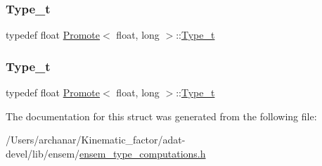 \subsubsection{\texorpdfstring{Type\_t}{Type\_t}\hspace{0.1cm}{\footnotesize\ttfamily [2/3]}}
{\footnotesize\ttfamily typedef float \mbox{\hyperlink{structPromote}{Promote}}$<$ float, long $>$\+::\mbox{\hyperlink{structPromote_3_01float_00_01long_01_4_a6959e098474512ecba3473c0f5863033}{Type\+\_\+t}}}

\mbox{\label{structPromote_3_01float_00_01long_01_4_a6959e098474512ecba3473c0f5863033}} 
\subsubsection{\texorpdfstring{Type\_t}{Type\_t}\hspace{0.1cm}{\footnotesize\ttfamily [3/3]}}
{\footnotesize\ttfamily typedef float \mbox{\hyperlink{structPromote}{Promote}}$<$ float, long $>$\+::\mbox{\hyperlink{structPromote_3_01float_00_01long_01_4_a6959e098474512ecba3473c0f5863033}{Type\+\_\+t}}}



The documentation for this struct was generated from the following file\+:\begin{DoxyCompactItemize}
\item 
/\+Users/archanar/\+Kinematic\+\_\+factor/adat-\/devel/lib/ensem/\mbox{\hyperlink{adat-devel_2lib_2ensem_2ensem__type__computations_8h}{ensem\+\_\+type\+\_\+computations.\+h}}\end{DoxyCompactItemize}
